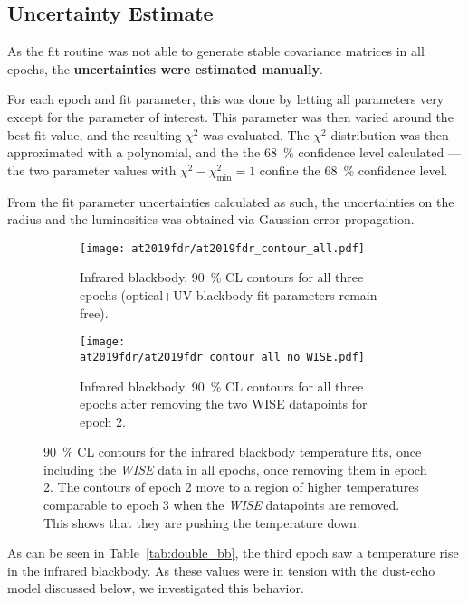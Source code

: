 \subsection{Uncertainty Estimate}
As the fit routine was not able to generate stable covariance matrices in all epochs, the \textbf{uncertainties were estimated manually}.

For each epoch and fit parameter, this was done by letting all parameters very except for the parameter of interest. This parameter was then varied around the best-fit value, and the resulting $\chi^2$ was evaluated. The $\chi^2$ distribution was then approximated with a polynomial, and the the \SI{68}{\percent} confidence level calculated --- the two parameter values with $\chi^2 - \chi^2_\text{min} = 1$ confine the \SI{68}{\percent} confidence level.

From the fit parameter uncertainties calculated as such, the uncertainties on the radius and the luminosities was obtained via Gaussian error propagation.

\begin{figure}[htb]
    \centering
    \begin{subfigure}{0.48\textwidth}
        \centering
        \texttt{[image: at2019fdr/at2019fdr\_contour\_all.pdf]}
        \caption{Infrared blackbody, \SI{90}{\percent} CL contours for all three epochs (optical+UV blackbody fit parameters remain free).}\label{fig:at2019fdr_contour_all}
    \end{subfigure}
    \hfill
    \begin{subfigure}{0.48\textwidth}
        \centering
        \texttt{[image: at2019fdr/at2019fdr\_contour\_all\_no\_WISE.pdf]}
        \caption{Infrared blackbody, \SI{90}{\percent} CL contours for all three epochs after removing the two WISE datapoints for epoch 2.}\label{fig:at2019fdr_contour_all_nowise}
    \end{subfigure}
    \caption[\emph{AT2019fdr} temperature fit]{\SI{90}{\percent} CL contours for the infrared blackbody temperature fits, once including the \textit{WISE} data in all epochs, once removing them in epoch 2. The contours of epoch 2 move to a region of higher temperatures comparable to epoch 3 when the \textit{WISE} datapoints are removed. This shows that they are pushing the temperature down.}\label{fig:at2019fdr_contour}
\end{figure}

As can be seen in Table~\ref{tab:double_bb}, the third epoch saw a temperature rise in the infrared blackbody. As these values were in tension with the dust-echo model discussed below, we investigated this behavior.

